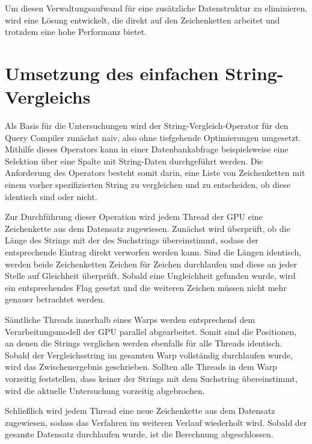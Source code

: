 Um diesen Verwaltungsaufwand für eine zusätzliche Datenstruktur zu eliminieren, wird eine Lösung entwickelt, die direkt auf den Zeichenketten arbeitet und trotzdem eine hohe Performanz bietet.

\section{Umsetzung des einfachen String-Vergleichs}
\label{sec:equals_umsetzung}

Als Basis für die Untersuchungen wird der String-Vergleich-Operator für den Query Compiler zunächst naiv, also ohne tiefgehende Optimierungen umgesetzt.
Mithilfe dieses Operators kann in einer Datenbankabfrage beispielsweise eine Selektion über eine Spalte mit String-Daten durchgeführt werden.
Die Anforderung des Operators besteht somit darin, eine Liste von Zeichenketten mit einem vorher spezifizierten String zu vergleichen und zu entscheiden, ob diese identisch sind oder nicht.

Zur Durchführung dieser Operation wird jedem Thread der GPU eine Zeichenkette aus dem Datensatz zugewiesen.
Zunächst wird überprüft, ob die Länge des Strings mit der des Suchstrings übereinstimmt, sodass der entsprechende Eintrag direkt verworfen werden kann.
Sind die Längen identisch, werden beide Zeichenketten Zeichen für Zeichen durchlaufen und diese an jeder Stelle auf Gleichheit überprüft.
Sobald eine Ungleichheit gefunden wurde, wird ein entsprechendes Flag gesetzt und die weiteren Zeichen müssen nicht mehr genauer betrachtet werden.

Sämtliche Threads innerhalb eines Warps werden entsprechend dem Verarbeitungsmodell der GPU parallel abgearbeitet.
Somit sind die Positionen, an denen die Strings verglichen werden ebenfalls für alle Threads identisch.
Sobald der Vergleichsstring im gesamten Warp vollständig durchlaufen wurde, wird das Zwischenergebnis geschrieben.
Sollten alle Threads in dem Warp vorzeitig feststellen, dass keiner der Strings mit dem Suchstring übereinstimmt, wird die aktuelle Untersuchung vorzeitig abgebrochen.

Schließlich wird jedem Thread eine neue Zeichenkette aus dem Datensatz zugewiesen, sodass das Verfahren im weiteren Verlauf wiederholt wird.
Sobald der gesamte Datensatz durchlaufen wurde, ist die Berechnung abgeschlossen.


